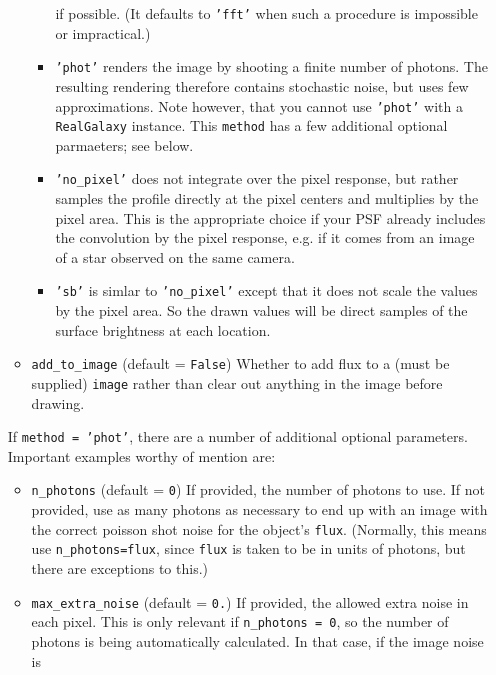 \documentclass[preprint,10pt]{../../devel/modules/aastex}
\begin{document}
\begin{itemize}
\begin{itemize}
\begin{itemize}
          if possible.  (It defaults to \texttt{'fft'} when such a procedure is impossible or 
          impractical.)
        \item \texttt{'phot'} renders the image by shooting a finite number of photons.
          The resulting rendering therefore contains stochastic noise, but uses few approximations.
          Note however, that you cannot use \texttt{'phot'} with a \texttt{RealGalaxy} instance.
          This \texttt{method} has a few additional optional parmaeters; see below.
        \item \texttt{'no\_pixel'} does not integrate over the pixel response, but rather samples
          the profile directly at the pixel centers and multiplies by the pixel area.  This is
          the appropriate choice if your PSF already includes the convolution by the pixel response,
          e.g. if it comes from an image of a star observed on the same camera.
        \item \texttt{'sb'} is simlar to \texttt{'no\_pixel'} except that it does not scale the
          values by the pixel area.  So the drawn values will be direct samples of the surface
          brightness at each location.
      \end{itemize}
    \item \texttt{add\_to\_image} (default = \texttt{False}) \newline
      Whether to add flux to a (must be supplied) \texttt{image} rather than clear out
      anything in the image before drawing.
  \end{itemize}
  If \texttt{method = 'phot'}, there are a number of additional optional parameters. Important
  examples worthy of mention are:
  \begin{itemize}
    \item \texttt{n\_photons} (default = \texttt{0}) \newline If provided,
      the number of photons to use.  If not provided, use as many photons
      as necessary to end up with an image with the correct poisson shot
      noise for the object's \texttt{flux}.  (Normally, this means use \texttt{n\_photons=flux},
      since \texttt{flux} is taken to be in units of photons, but there are exceptions to this.)
    \item \texttt{max\_extra\_noise} (default = \texttt{0.}) \newline If
      provided, the allowed extra noise in each pixel.  This is only
      relevant if \texttt{n\_photons = 0}, so the number of photons is
      being automatically calculated.  In that case, if the image noise is

\end{itemize}
\end{itemize}
\end{document}

